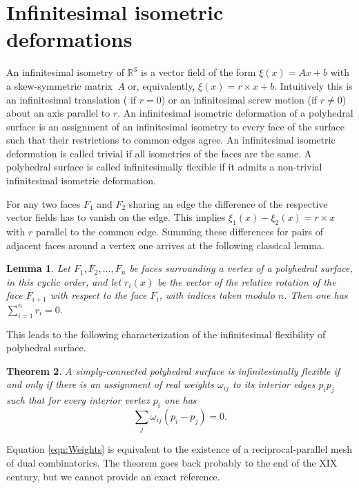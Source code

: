 \documentclass{amsart}
\newtheorem{thm}{Theorem}
\newtheorem{lem}[thm]{Lemma}
\theoremstyle{definition}
\newcommand\RR{\mathbb{R}}
\begin{document}
\section{Infinitesimal isometric deformations}
\label{sec:IID}
An infinitesimal isometry of $\RR^3$ is a vector field of the form $\xi(x) = Ax+b$ with a skew-symmetric matrix~$A$ or, equivalently, $\xi(x) = r \times x + b$.
Intuitively this is an infinitesimal translation ( if $r = 0$) or an infinitesimal screw motion (if $r \ne 0$) about an axis parallel to $r$.
An infinitesimal isometric deformation of a polyhedral surface is an assignment of an infinitesimal isometry to every face of the surface such that their restrictions to common edges agree.
An infinitesimal isometric deformation is called trivial if all isometries of the faces are the same.
A polyhedral surface is called infinitesimally flexible if it admits a non-trivial infinitesimal isometric deformation.

For any two faces $F_1$ and $F_2$ sharing an edge the difference of the respective vector fields has to vanish on the edge.
This implies $\xi_1(x) - \xi_2(x) = r \times x$ with $r$ parallel to the common edge.
Summing these differences for pairs of adjacent faces around a vertex one arrives at the following classical lemma.

\begin{lem}
Let $F_1, F_2, \ldots, F_n$ be faces surrounding a vertex of a polyhedral surface, in this cyclic order, and let $r_i(x)$ be the vector of the relative rotation of the face $F_{i+1}$ with respect to the face $F_i$, with indices taken modulo $n$.
Then one has $\sum_{i=1}^n r_i = 0$.
\end{lem}

This leads to the following characterization of the infinitesimal flexibility of polyhedral surface.

\begin{thm}
\label{thm:Weights}
A simply-connected polyhedral surface is infinitesimally flexible if and only if there is an assignment of real weights $\omega_{ij}$ to its interior edges $p_ip_j$ such that for every interior vertex $p_i$ one has
\begin{equation}
\label{eqn:Weights}
\sum_{j} \omega_{ij}(p_i - p_j) = 0.
\end{equation}
\end{thm}

Equation \eqref{eqn:Weights} is equivalent to the existence of a reciprocal-parallel mesh of dual combinatorics.
The theorem goes back probably to the end of the XIX century, but we cannot provide an exact reference.
\end{document}
